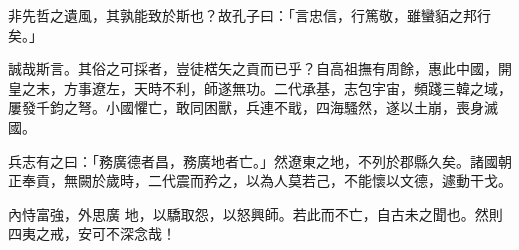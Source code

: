 \begin{pinyinscope}
 非先哲之遺風，其孰能致於斯也？故孔子曰：「言忠信，行篤敬，雖蠻貊之邦行矣。」



 誠哉斯言。其俗之可採者，豈徒楛矢之貢而已乎？自高祖撫有周餘，惠此中國，開皇之末，方事遼左，天時不利，師遂無功。二代承基，志包宇宙，頻踐三韓之域，屢發千鈞之弩。小國懼亡，敢同困獸，兵連不戢，四海騷然，遂以土崩，喪身滅國。



 兵志有之曰：「務廣德者昌，務廣地者亡。」然遼東之地，不列於郡縣久矣。諸國朝正奉貢，無闕於歲時，二代震而矜之，以為人莫若己，不能懷以文德，遽動干戈。



 內恃富強，外思廣
 地，以驕取怨，以怒興師。若此而不亡，自古未之聞也。然則四夷之戒，安可不深念哉！



\end{pinyinscope}